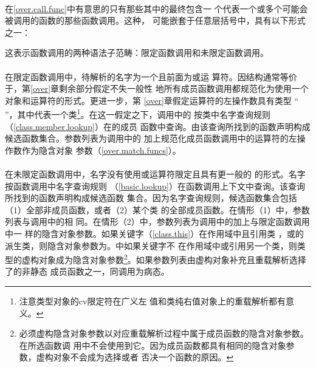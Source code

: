 \paragraph{}
在\ref{over.call.func}中有意思的只有那些其中的最终包含一
个代表一个或多个可能会被调用的函数的那些函数调用。这种，
可能嵌套于任意层括号中，具有以下形式之一：


这表示函数调用的两种语法子范畴：限定函数调用和未限定函数调用。

\paragraph{}
在限定函数调用中，待解析的名字为一个且前面为\tm{->}或运
算符。因结构通常等价于，第\ref{over}章剩余部分假定不失一般性
地所有成员函数调用都规范化为使用一个对象和运算符的形式。更进一步，第
\ref{over}章假定运算符的左操作数具有类型
`` ''，其中代表一个类\footnote{注意类型对象的cv限定符在广义左
值和类纯右值对象上的重载解析都有意义。}。在这一假定之下，调用中的
按类中名字查询规则（\ref{class.member.lookup}）在的成员
函数中查询。由该查询所找到的函数声明构成候选函数集合。参数列表为调用中的
加上规范化成员函数调用中的运算符的左操作数作为隐含对象
参数（\ref{over.match.funcs}）。

\paragraph{}
在未限定函数调用中，名字没有使用\tm{->}或运算符限定且具有更一般的
的形式。名字按函数调用中名字查询规则
（\ref{basic.lookup}）在函数调用上下文中查询。该查询所找到的函数声明构成候选函数
集合。因为名字查询规则，候选函数集合包括（1）全部非成员函数，或者（2）某个类
的全部成员函数。在情形（1）中，参数列表与调用中的相
同。在情形（2）中，参数列表为调用中的加上与限定函数调用中一
样的隐含对象参数。如果关键字（\ref{class.this}）在作用域中且引用类
，或的派生类，则隐含对象参数为。中如果关键字不
在作用域中或引用另一个类，则类型的虚构对象成为隐含对象参数\footnote{
必须虚构隐含对象参数以对应重载解析过程中属于成员函数的隐含对象参数。在所选函数调
用中不会使用到它。因为成员函数都具有相同的隐含对象参数，虚构对象不会成为选择或者
否决一个函数的原因。}。如果参数列表由虚构对象补充且重载解析选择了的非静态
成员函数之一，同调用为病态。

